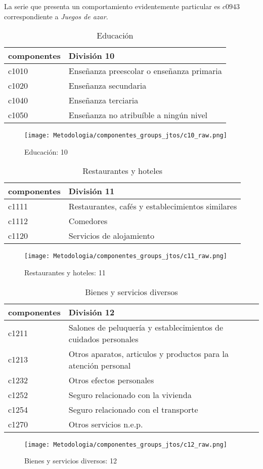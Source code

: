\documentclass[12pt]{article}
\begin{document}
La serie que presenta un comportamiento evidentemente particular es $c0943$ correspondiente a \textit{Juegos de azar}.


\clearpage
\begin{table}[h!]
\caption{Educación}
\label{tab:compo_10}
\begin{tabular}{l m{10cm}}
\toprule
componentes & División 10 \\
\midrule
c1010 & Enseñanza preescolar o enseñanza primaria \\
c1020 & Enseñanza secundaria \\
c1040 & Enseñanza terciaria \\
c1050 & Enseñanza no atribuíble a ningún nivel \\
\bottomrule
\end{tabular}
\end{table}
\begin{figure}[h!]
    \caption{Educación: 10}
    \label{fig:c10_raw}
    \centering
    \texttt{[image: Metodologia/componentes\_groups\_jtos/c10\_raw.png]}
\end{figure}
\clearpage
\begin{table}[h!]
\caption{Restaurantes y hoteles}
\label{tab:compo_11}
\begin{tabular}{l m{10cm}}
\toprule
componentes & División 11 \\
\midrule
c1111 & Restaurantes, cafés y establecimientos similares \\
c1112 & Comedores \\
c1120 & Servicios de alojamiento \\
\bottomrule
\end{tabular}
\end{table}
\begin{figure}[h!]
    \caption{Restaurantes y hoteles: 11}
    \label{fig:c11_raw}
    \centering
    \texttt{[image: Metodologia/componentes\_groups\_jtos/c11\_raw.png]}
\end{figure}
\clearpage
\begin{table}[h!]
\caption{Bienes y servicios diversos}
\label{tab:compo_12}
\begin{tabular}{l m{10cm}}
\toprule
componentes & División 12 \\
\midrule
c1211 & Salones de peluquería y establecimientos de cuidados personales \\
c1213 & Otros aparatos, articulos y productos para la atención personal \\
c1232 & Otros efectos personales \\
c1252 & Seguro relacionado con la vivienda \\
c1254 & Seguro relacionado con el transporte \\
c1270 & Otros servicios n.e.p. \\
\bottomrule
\end{tabular}
\end{table}
\begin{figure}[h!]
    \caption{Bienes y servicios diversos: 12}
    \label{fig:c12_raw}
    \centering
    \texttt{[image: Metodologia/componentes\_groups\_jtos/c12\_raw.png]}
\end{figure}


\end{document}
